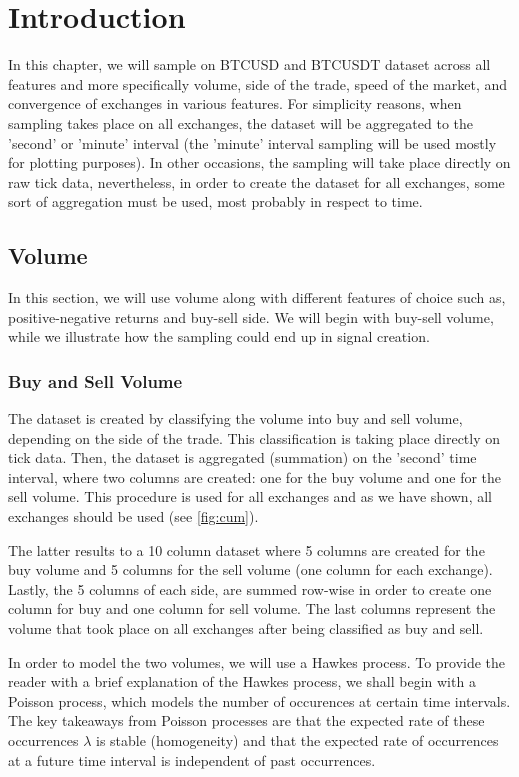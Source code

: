
\section{Introduction}

In this chapter, we will sample on BTCUSD and BTCUSDT dataset across all features and more specifically volume, side of the trade, speed of the market, and convergence of exchanges in various features. For simplicity reasons, when sampling takes place on all exchanges, the dataset will be aggregated to the 'second' or 'minute' interval (the 'minute' interval sampling will be used mostly for plotting purposes). In other occasions, the sampling will take place directly on raw tick data, nevertheless, in order to create the dataset for all exchanges, some sort of aggregation must be used, most probably in respect to time.

\subsection{Volume}

In this section, we will use volume along with different features of choice such as, positive-negative returns and buy-sell side. We will begin with buy-sell volume, while we illustrate how the sampling could end up in signal creation.

\subsubsection{Buy and Sell Volume}

The dataset is created by classifying the volume into buy and sell volume, depending on the side of the trade. This classification is taking place directly on tick data. Then, the dataset is aggregated (summation) on the 'second' time interval, where two columns are created: one for the buy volume and one for the sell volume. This procedure is used for all exchanges and as we have shown, all exchanges should be used (see \ref{fig:cum}). 

The latter results to a 10 column dataset where 5 columns are created for the buy volume and 5 columns for the sell volume (one column for each exchange). Lastly, the 5 columns of each side, are summed row-wise in order to create one column for buy and one column for sell volume. The last columns represent the volume that took place on all exchanges after being classified as buy and sell.

In order to model the two volumes, we will use a Hawkes process. To provide the reader with a brief explanation of the Hawkes process, we shall begin with a Poisson process, which models the number of occurences at certain time intervals. The key takeaways from Poisson processes are that the expected rate of these occurrences \( \lambda \) is stable (homogeneity) and that the expected rate of occurrences at a future time interval is independent of past occurrences. 

